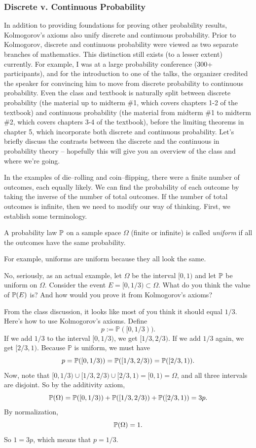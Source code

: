 \documentclass{ximera}
\begin{document}
\subsubsection{Discrete v. Continuous Probability}
In addition to providing foundations for proving other probability results, Kolmogorov's axioms also unify discrete and continuous probability. Prior to Kolmogorov, discrete and continuous probability were viewed as two separate branches of mathematics. This distinction still exists (to a lesser extent) currently. For example, I was at a large probability conference (300+ participants), and for the introduction to one of the talks, the organizer credited the speaker for convincing him to move from discrete probability to continuous probability. Even the class and textbook is naturally split between discrete probability (the material up to midterm \#1, which covers chapters 1-2 of the textbook) and continuous probability (the material from midterm \#1 to midterm \#2, which covers chapters 3-4 of the textbook), before the limiting theorems in chapter 5, which incorporate both discrete and continuous probability. Let's briefly discuss the contrasts between the discrete and the continuous in probability theory -- hopefully this will give you an overview of the class and where we're going.

In the examples of die--rolling and coin--flipping, there were a finite number of outcomes, each equally likely. We can find the probability of each outcome by taking the inverse of the number of total outcomes.  If the number of total outcomes is infinite, then we need to modify our way of thinking. First, we establish some terminology.

\begin{definition}
A probability law $\mathbb{P}$ on a sample space $\Omega$ (finite or infinite) is called \textit{uniform} if all the outcomes have the same probability.
\end{definition}

For example, uniforms are uniform because they all look the same. 

No, seriously, as an actual example, let $\Omega$ be the interval $[0,1)$ and let $\mathbb{P}$ be uniform on $\Omega$. Consider the event $E=[0,1/3)\subset \Omega$. What do you think the value of $\mathbb{P}(E)$ is? And how would you prove it from Kolmogorov's axioms?

From the class discussion, it looks like most of you think it should equal $1/3$. Here's how to use Kolmogorov's axioms. Define 
$$
p:= \mathbb{P}([0,1/3)).
$$
If we add $1/3$ to the interval $[0,1/3)$, we get $[1/3,2/3)$. If we add $1/3$ again, we get $[2/3,1)$. Because $\mathbb{P}$ is uniform, we must have
$$
p=\mathbb{P}([0,1/3)) = \mathbb{P}([1/3,2/3)) = \mathbb{P}([2/3,1)).
$$
Now, note that $[0,1/3) \cup [1/3,2/3) \cup [2/3,1) = [0,1)=\Omega$, and all three intervals are disjoint. So by the additivity axiom,
$$
\mathbb{P}(\Omega) = \mathbb{P}([0,1/3)) + \mathbb{P}([1/3,2/3)) + \mathbb{P}([2/3,1)) = 3p.
$$
By normalization,
$$
\mathbb{P}(\Omega)=1.
$$
So $1=3p$, which means that $p=1/3$.
\end{document}
